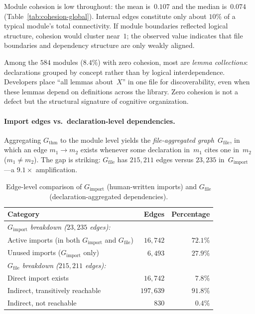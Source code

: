 Module cohesion is low throughout: the mean is~$0.107$ and the median is~$0.074$ (Table~\ref{tab:cohesion-global}). Internal edges constitute only about $10\%$ of a typical module's total connectivity. If module boundaries reflected logical structure, cohesion would cluster near~$1$; the observed value indicates that file boundaries and dependency structure are only weakly aligned.

\begin{remark}
\label{rem:zero-cohesion}
Among the $584$ modules ($8.4\%$) with zero cohesion, most are \emph{lemma collections}: declarations grouped by concept rather than by logical interdependence. Developers place ``all lemmas about~$X$'' in one file for discoverability, even when these lemmas depend on definitions across the library. Zero cohesion is not a defect but the structural signature of cognitive organization.
\end{remark}

\paragraph{Import edges vs.\ declaration-level dependencies.}
\label{sec:import_vs_declaration}

\noindent Aggregating $G_{\mathrm{thm}}$ to the module level yields the \emph{file-aggregated graph}~$G_{\mathrm{file}}$, in which an edge $m_1 \to m_2$ exists whenever some declaration in~$m_1$ cites one in~$m_2$ ($m_1 \neq m_2$). The gap is striking: $G_{\mathrm{file}}$ has $215{,}211$ edges versus $23{,}235$ in~$G_{\mathrm{import}}$---a $9.1\times$ amplification.

\begin{table}[ht]
\centering
\caption{Edge-level comparison of $G_{\mathrm{import}}$ (human-written imports) and $G_{\mathrm{file}}$ (declaration-aggregated dependencies).}
\label{tab:import-vs-file}
\begin{tabular}{lrr}
\toprule
Category & Edges & Percentage \\
\midrule
\multicolumn{3}{l}{\emph{$G_{\mathrm{import}}$ breakdown ($23{,}235$ edges):}} \\
\quad Active imports (in both $G_{\mathrm{import}}$ and $G_{\mathrm{file}}$) & $16{,}742$ & $72.1\%$ \\
\quad Unused imports ($G_{\mathrm{import}}$ only) & $6{,}493$ & $27.9\%$ \\
\midrule
\multicolumn{3}{l}{\emph{$G_{\mathrm{file}}$ breakdown ($215{,}211$ edges):}} \\
\quad Direct import exists & $16{,}742$ & $7.8\%$ \\
\quad Indirect, transitively reachable & $197{,}639$ & $91.8\%$ \\
\quad Indirect, not reachable & $830$ & $0.4\%$ \\
\bottomrule
\end{tabular}
\end{table}

